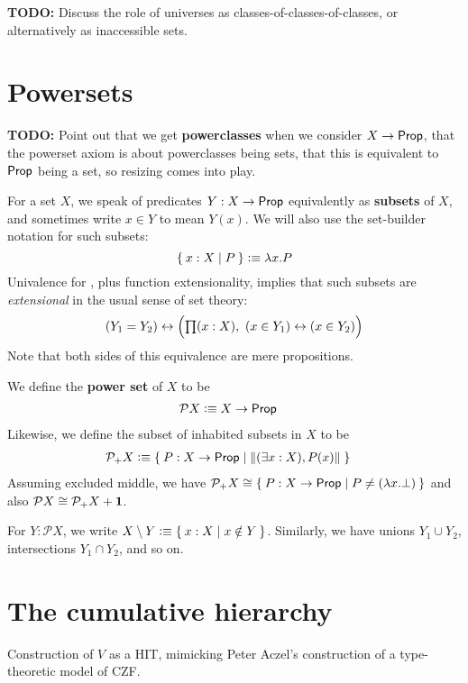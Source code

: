 \textbf{TODO:} Discuss the role of universes as classes-of-classes-of-classes, or
alternatively as inaccessible sets.

\section{Powersets}
\label{sec:powersets}

\textbf{TODO:} Point out that we get \textbf{powerclasses} when we consider $X \to \mathsf{Prop}$, that the
powerset axiom is about powerclasses being sets, that this is equivalent to $\mathsf{Prop}$ being
a set, so resizing comes into play.

For a set $X$, we speak of predicates $Y:X\to \mathsf{Prop}$ equivalently as \textbf{subsets} of $X$, and sometimes write $x\in Y$ to mean $Y(x)$.
We will also use the set-builder notation for such subsets:
\[ \Set{x:X | P } \vcentcolon\equiv \lambda x.P \]
Univalence for \prop, plus function extensionality, implies that such subsets are \emph{extensional} in the usual sense of set theory:
\[ (Y_1 = Y_2) \leftrightarrow \Big(\prd{x:X} (x\in Y_1) \leftrightarrow (x\in Y_2)\Big) \]
Note that both sides of this equivalence are mere propositions.

We define the \textbf{power set} of $X$ to be
\begin{align*}
  \mathcal{P} X &\vcentcolon\equiv X\to \mathsf{Prop}
\end{align*}
Likewise, we define the subset of inhabited subsets in $X$ to be
\begin{align*}
  \mathcal{P}_+ X &\defeq \setof{P:X\to \prop | \brck{(\exists x:X), P(x)}}
\end{align*}
Assuming excluded middle, we have $\mathcal{P}_+ X \cong \setof{P:X\to \prop | P \neq (\lambda x.\bot)}$ and also $\mathcal{P} X \cong \mathcal{P}_+ X + \mathbf{1}$.

For $Y:\mathcal{P}X$, we write $X\setminus Y \vcentcolon\equiv \Set{x:X | x\notin Y}$.
Similarly, we have unions $Y_1 \cup Y_2$, intersections $Y_1 \cap Y_2$, and so on.

\section{The cumulative hierarchy}
\label{sec:cumulative-hierarchy}

Construction of $V$ as a HIT, mimicking Peter Aczel's construction of a type-theoretic
model of CZF.





